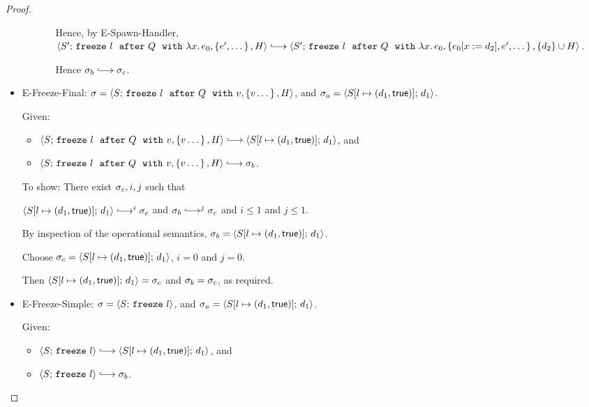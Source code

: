 \begin{proof}
\begin{itemize}
\begin{itemize}
\begin{enumerate}
          Hence, by {\sc E-Spawn-Handler}, \\
          $\config{S'}{\freezeafterfull{l}{Q}{\lam{x}{e_0}}{\setof{e',
              \dots}}{H}} \parstepsto \\
          \config{S'}{\freezeafterfull{l}{Q}{\lam{x}{e_0}}{\setof{\subst{e_0}{x}{d_2}, e',
                \dots}}{\{d_2\}\cup H}}$.

          Hence $\conf_b \parstepsto \conf_c$.
        \end{enumerate}

      \end{itemize}

    \item {\sc E-Freeze-Final}: $\sigma =
      \langle S;\, \mbox{\texttt{freeze}}~l~~{\mbox{\texttt{after}}}~Q~~{\mbox{\texttt{with}}}~v, \left\{v\dots\right\}, H \rangle$, and
      $\sigma_a = \langle S[l \mapsto (d_1, \textsf{true})];\, d_1 \rangle$.

      Given:
      \begin{itemize}
      \item $\config{S}{\freezeafterfull{l}{Q}{v}{\setof{v\dots}}{H}}
        \parstepsto \config{\extS{S}{l}{d_1}{\frozentrue}}{d_1}$, and
      \item $\config{S}{\freezeafterfull{l}{Q}{v}{\setof{v\dots}}{H}} \parstepsto \conf_b$.
      \end{itemize}

      To show: There exist $\sigma_c, i, j$ such that

      $\config{\extS{S}{l}{d_1}{\frozentrue}}{d_1} \parstepsto^i
      \conf_c$ and $\conf_b \parstepsto^j \conf_c$ and $i \leq 1$ and
      $j \leq 1$.

      By inspection of the operational semantics, $\sigma_b =
      \langle S[l \mapsto (d_1, \textsf{true})];\, d_1 \rangle$.

      Choose $\sigma_c = \langle S[l \mapsto (d_1, \textsf{true})];\, d_1 \rangle$,
      $i = 0$ and $j = 0$.

      Then $\langle S[l \mapsto (d_1, \textsf{true})];\, d_1 \rangle = \sigma_c$ and
      $\sigma_b = \sigma_c$, as required.

    \item {\sc E-Freeze-Simple}: $\sigma =
      \langle S;\, \mbox{\texttt{freeze}}~l \rangle$, and $\sigma_a =
      \langle S[l \mapsto (d_1, \textsf{true})];\, d_1 \rangle$.

      Given:
      \begin{itemize}
      \item $\config{S}{\freeze{l}} \parstepsto \config{\extS{S}{l}{d_1}{\frozentrue}}{d_1}$, and
      \item $\config{S}{\freeze{l}} \parstepsto \conf_b$.
      \end{itemize}


\end{itemize}
\end{proof}
